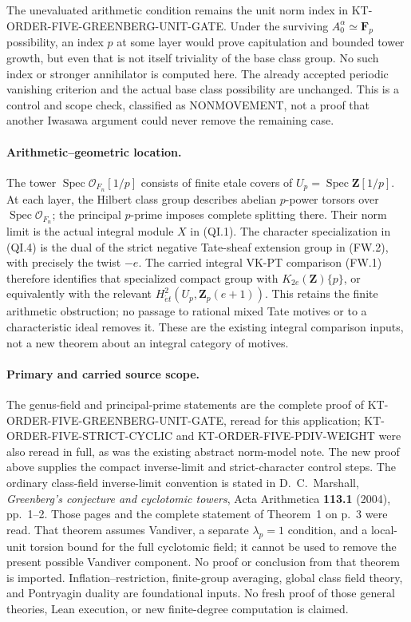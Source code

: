 The unevaluated arithmetic condition remains the unit norm index
in KT-ORDER-FIVE-GREENBERG-UNIT-GATE.  Under the surviving
$A_0^\alpha\simeq\mathbf F_p$ possibility, an index $p$ at some
layer would prove capitulation and bounded tower growth, but even
that is not itself triviality of the base class group.  No such
index or stronger annihilator is computed here.  The already
accepted periodic vanishing criterion and the actual base class
possibility are unchanged.  This is a control and scope check,
classified as NONMOVEMENT, not a proof that another Iwasawa
argument could never remove the remaining case.

\paragraph{Arithmetic--geometric location.}
The tower $\operatorname{Spec}\mathcal O_{F_n}[1/p]$ consists
of finite etale covers of $U_p=\operatorname{Spec}\mathbf Z[1/p]$.
At each layer, the Hilbert class group describes abelian
$p$-power torsors over $\operatorname{Spec}\mathcal O_{F_n}$;
the principal $p$-prime imposes complete splitting there.
Their norm limit is the actual integral module $X$ in (QI.1).
The character specialization in (QI.4) is the dual of the strict
negative Tate-sheaf extension group in (FW.2), with precisely
the twist $-e$.  The carried integral VK-PT comparison (FW.1)
therefore identifies that specialized compact group with
$K_{2e}(\mathbf Z)\{p\}$, or equivalently with the relevant
$H^2_{\acute et}(U_p,\mathbf Z_p(e+1))$.
This retains the finite arithmetic obstruction; no passage to
rational mixed Tate motives or to a characteristic ideal
removes it.  These are the existing integral comparison inputs,
not a new theorem about an integral category of motives.

\paragraph{Primary and carried source scope.}
The genus-field and principal-prime statements are the complete
proof of KT-ORDER-FIVE-GREENBERG-UNIT-GATE, reread for this
application; KT-ORDER-FIVE-STRICT-CYCLIC and
KT-ORDER-FIVE-PDIV-WEIGHT were also reread in full, as was the
existing abstract norm-model note.  The new proof above supplies
the compact inverse-limit and strict-character control steps.
The ordinary class-field inverse-limit convention is stated in
D.~C.~Marshall, \emph{Greenberg's conjecture and cyclotomic towers},
Acta Arithmetica \textbf{113.1} (2004), pp.~1--2.
Those pages and the complete statement of Theorem~1 on p.~3 were
read.  That theorem assumes Vandiver, a separate $\lambda_p=1$
condition, and a local-unit torsion bound for the full cyclotomic
field; it cannot be used to remove the present possible Vandiver
component.  No proof or conclusion from that theorem is imported.
Inflation--restriction, finite-group averaging, global class
field theory, and Pontryagin duality are foundational inputs.
No fresh proof of those general theories, Lean execution, or
new finite-degree computation is claimed.
